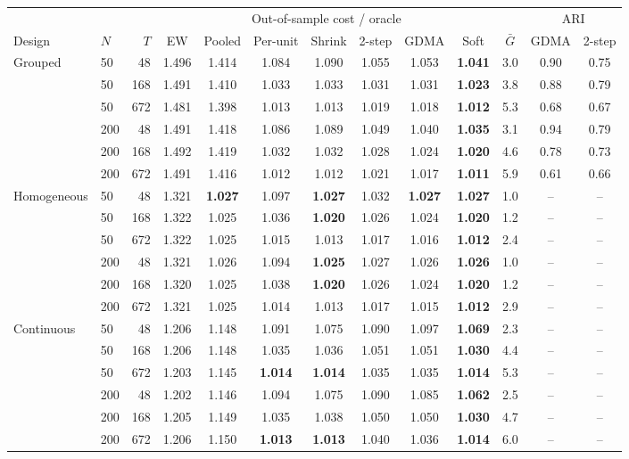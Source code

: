 \begin{tabular}{@{}llrcccccccccc@{}}
\toprule
 & & & \multicolumn{7}{c}{Out-of-sample cost / oracle} & & \multicolumn{2}{c}{ARI} \\
\cmidrule(lr){4-10}\cmidrule(lr){12-13}
Design & $N$ & $T$ & EW & Pooled & Per-unit & Shrink & 2-step & GDMA & Soft & $\bar G$ & GDMA & 2-step \\
\midrule
Grouped & 50 & 48 & 1.496 & 1.414 & 1.084 & 1.090 & 1.055 & 1.053 & \textbf{1.041} & 3.0 & 0.90 & 0.75 \\
 & 50 & 168 & 1.491 & 1.410 & 1.033 & 1.033 & 1.031 & 1.031 & \textbf{1.023} & 3.8 & 0.88 & 0.79 \\
 & 50 & 672 & 1.481 & 1.398 & 1.013 & 1.013 & 1.019 & 1.018 & \textbf{1.012} & 5.3 & 0.68 & 0.67 \\
 & 200 & 48 & 1.491 & 1.418 & 1.086 & 1.089 & 1.049 & 1.040 & \textbf{1.035} & 3.1 & 0.94 & 0.79 \\
 & 200 & 168 & 1.492 & 1.419 & 1.032 & 1.032 & 1.028 & 1.024 & \textbf{1.020} & 4.6 & 0.78 & 0.73 \\
 & 200 & 672 & 1.491 & 1.416 & 1.012 & 1.012 & 1.021 & 1.017 & \textbf{1.011} & 5.9 & 0.61 & 0.66 \\
\addlinespace
Homogeneous & 50 & 48 & 1.321 & \textbf{1.027} & 1.097 & \textbf{1.027} & 1.032 & \textbf{1.027} & \textbf{1.027} & 1.0 & -- & -- \\
 & 50 & 168 & 1.322 & 1.025 & 1.036 & \textbf{1.020} & 1.026 & 1.024 & \textbf{1.020} & 1.2 & -- & -- \\
 & 50 & 672 & 1.322 & 1.025 & 1.015 & 1.013 & 1.017 & 1.016 & \textbf{1.012} & 2.4 & -- & -- \\
 & 200 & 48 & 1.321 & 1.026 & 1.094 & \textbf{1.025} & 1.027 & 1.026 & \textbf{1.026} & 1.0 & -- & -- \\
 & 200 & 168 & 1.320 & 1.025 & 1.038 & \textbf{1.020} & 1.026 & 1.024 & \textbf{1.020} & 1.2 & -- & -- \\
 & 200 & 672 & 1.321 & 1.025 & 1.014 & 1.013 & 1.017 & 1.015 & \textbf{1.012} & 2.9 & -- & -- \\
\addlinespace
Continuous & 50 & 48 & 1.206 & 1.148 & 1.091 & 1.075 & 1.090 & 1.097 & \textbf{1.069} & 2.3 & -- & -- \\
 & 50 & 168 & 1.206 & 1.148 & 1.035 & 1.036 & 1.051 & 1.051 & \textbf{1.030} & 4.4 & -- & -- \\
 & 50 & 672 & 1.203 & 1.145 & \textbf{1.014} & \textbf{1.014} & 1.035 & 1.035 & \textbf{1.014} & 5.3 & -- & -- \\
 & 200 & 48 & 1.202 & 1.146 & 1.094 & 1.075 & 1.090 & 1.085 & \textbf{1.062} & 2.5 & -- & -- \\
 & 200 & 168 & 1.205 & 1.149 & 1.035 & 1.038 & 1.050 & 1.050 & \textbf{1.030} & 4.7 & -- & -- \\
 & 200 & 672 & 1.206 & 1.150 & \textbf{1.013} & \textbf{1.013} & 1.040 & 1.036 & \textbf{1.014} & 6.0 & -- & -- \\
\bottomrule
\end{tabular}